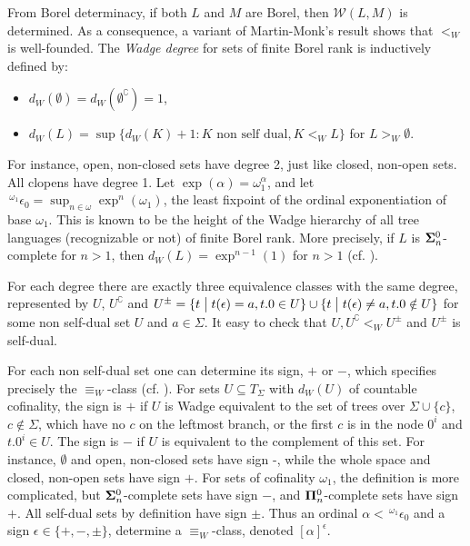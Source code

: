\documentclass{llncs}
\begin{document}
  From Borel determinacy,
if both $L$ and $M$ are Borel, then $\mathcal{W}(L, M)$ is determined.
As a consequence, a variant of Martin-Monk's result shows that $<_W$ is
well-founded. The \emph{Wadge degree} for sets of finite Borel rank is
inductively defined by:
\begin{itemize}
\item $d_W(\emptyset)=d_W(\emptyset^\complement)=1$,
\item $d_W(L)=\sup\{d_W(K)+1\colon K \text{ non self dual}, K <_WL\}$ for $L>_W\emptyset$.
\end{itemize}

For instance, open, non-closed sets have degree 2, just like closed,
non-open sets. All clopens have degree 1. 
Let $\exp(\alpha) = \omega_1^\alpha$, and let 
$\,{}^{\omega_1} \epsilon_0 = \sup_{n \in\omega} \exp^n(\omega_1)$, the least fixpoint of the 
ordinal exponentiation of base $\omega_1$. This is known to be the
height of the Wadge hierarchy of all tree languages (recognizable or
not) of finite Borel rank. More precisely, if $L$ is ${\bf
  \Sigma}^0_n$-complete for $n>1$, then $d_W(L) = \exp^{n-1}(1)$ for $n>1$  (cf. \cite{dup1}).

For each degree there are exactly three equivalence
classes with the same degree, represented by $U$, $U^\complement$ and
$U^\pm = \{t \bigm | t(\epsilon) = a, t.0\in U \} \cup  \{t \bigm |
t(\epsilon) \neq a, t.0\notin U \}$ for some non self-dual set $U$ and
$a\in\Sigma$. It easy to check that $U, U^\complement <_W U^\pm$ and
$U^\pm$ is self-dual.

For each non self-dual set one can determine its sign, $+$
or $-$, which specifies precisely the $\equiv_W$-class
(cf. \cite{dup1}). For sets $U\subseteq T_\Sigma$ with $d_W(U)$ of countable cofinality, the sign
is $+$ if $U$ is Wadge equivalent to the set of trees over $\Sigma
\cup \{c\}$, $c\notin \Sigma$, which have no $c$ on the leftmost
branch, or the first $c$ is in the node $0^i$ and $t.0^i \in U$. The
sign is $-$ if $U$ is equivalent to the complement of this set. 
For instance, $\emptyset$ and open, non-closed sets have sign -,
while the whole space and closed, non-open sets have sign $+$.
For sets of cofinality $\omega_1$, the definition is more complicated, but
${\bf \Sigma}^0_n$-complete sets have sign $-$, and ${\bf
  \Pi}^0_n$-complete sets have sign $+$. All self-dual sets by
definition have sign $\pm$. Thus an ordinal $\alpha <\,
{}^{\omega_1}\epsilon_0$ and a sign $\epsilon \in \{+,-,\pm\}$,
determine a $\equiv_W$-class, denoted  $[\alpha]^\epsilon$. 
\end{document}
